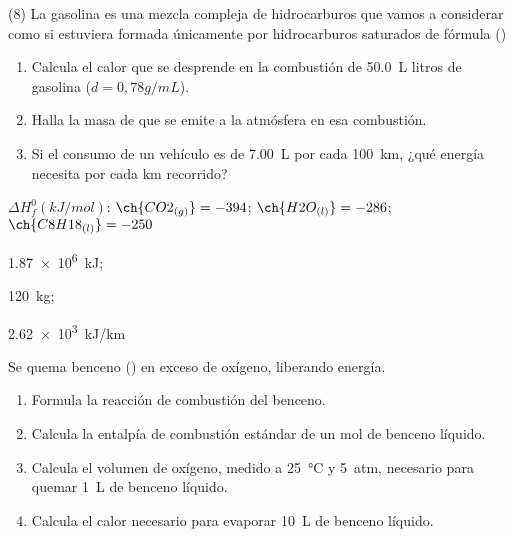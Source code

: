 \documentclass[10pt]{article}
\newenvironment{gexdatos}{
  \noindent\makebox[0pt][r]{\textit{Datos:}}
  }{\vspace{5pt}}
\begin{document}
\begin{multicols}{2}
\begin{exercise}[
    tags    = {},
    topics  = {química,química básica},
    source  = {FQ 1B MGH 2016, p85, e26},
  ]

  (8) La gasolina es una mezcla compleja de hidrocarburos que
  vamos a considerar como si estuviera formada únicamente
  por hidrocarburos saturados de fórmula ()
  \begin{enumerate}
    \item Calcula el calor que se desprende en la combustión de
    \SI{50.0}{\liter} litros de gasolina (\( d = 0,78 g/mL \)).
    \item Halla la masa de  que se emite a la atmósfera en esa
    combustión.
    \item Si el consumo de un vehículo es de \SI{7.00}{\liter} por cada
    \SI{100}{km}, ¿qué energía necesita por cada \si{km} recorrido?
  \end{enumerate}

  \begin{gexdatos}
    \( \Delta H^0_f (\si{kJ/mol}) \): \( \ch{CO2_{(g)}} = -394 \); \( \ch{H2O_{(l)}} = -286 \); \( \ch{C8H18_{(l)}} = -250 \)
  \end{gexdatos}

\end{exercise}

\begin{solution}
  \begin{enumerate*}
    \item \SI{1.87e6}{kJ}; \item \SI{120}{\kilo\gram}; \item \SI{2.62e3}{kJ/km}
  \end{enumerate*}
\end{solution}





\begin{exercise}[
    tags    = {},
    topics  = {química,química básica},
    source  = {FQ 1B MGH 2016, p85, e26},
  ]

  Se quema benceno () en exceso de oxígeno, liberando energía.

  \begin{enumerate}
    \item Formula la reacción de combustión del benceno.
    \item Calcula la entalpía de combustión estándar de un mol de
    benceno líquido.
    \item Calcula el volumen de oxígeno, medido a \SI{25}{\celsius} y \SI{5}{atm}, necesario para quemar \SI{1}{\liter} de benceno líquido.
    \item Calcula el calor necesario para evaporar \SI{10}{\liter} de benceno líquido.
  \end{enumerate}


\end{exercise}
\end{multicols}
\end{document}
